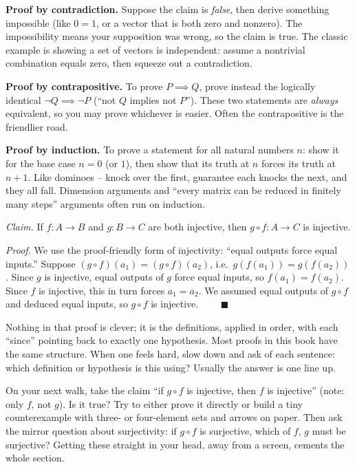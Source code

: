 \textbf{Proof by contradiction.} Suppose the claim is \emph{false}, then derive something
impossible (like $0 = 1$, or a vector that is both zero and nonzero). The impossibility
means your supposition was wrong, so the claim is true. The classic example is showing a
set of vectors is independent: assume a nontrivial combination equals zero, then squeeze
out a contradiction.

\textbf{Proof by contrapositive.} To prove $P \implies Q$, prove instead the logically
identical $\neg Q \implies \neg P$ (``not $Q$ implies not $P$''). These two statements
are \emph{always} equivalent, so you may prove whichever is easier. Often the
contrapositive is the friendlier road.

\textbf{Proof by induction.} To prove a statement for all natural numbers $n$: show it for
the base case $n = 0$ (or $1$), then show that its truth at $n$ forces its truth at $n+1$.
Like dominoes -- knock over the first, guarantee each knocks the next, and they all fall.
Dimension arguments and ``every matrix can be reduced in finitely many steps'' arguments
often run on induction.

\begin{example}\label{ch38:directproof}
\emph{Claim.} If $f:A\to B$ and $g:B\to C$ are both injective, then $g\circ f : A \to C$
is injective.

\emph{Proof.} We use the proof-friendly form of injectivity: ``equal outputs force equal
inputs.'' Suppose $(g\circ f)(a_1) = (g\circ f)(a_2)$, i.e.\ $g(f(a_1)) = g(f(a_2))$. Since
$g$ is injective, equal outputs of $g$ force equal inputs, so $f(a_1) = f(a_2)$. Since $f$
is injective, this in turn forces $a_1 = a_2$. We assumed equal outputs of $g\circ f$ and
deduced equal inputs, so $g \circ f$ is injective. $\qquad\blacksquare$
\end{example}

Nothing in that proof is clever; it is the definitions, applied in
order, with each ``since'' pointing back to exactly one hypothesis. Most
proofs in this book have the same structure. When one feels hard, slow down and
ask of each sentence: which definition or hypothesis is this using? Usually the
answer is one line up.

\begin{walkbox}
On your next walk, take the claim ``if $g \circ f$ is injective, then $f$ is injective''
(note: only $f$, not $g$). Is it true? Try to either prove it directly or build a tiny
counterexample with three- or four-element sets and arrows on paper. Then ask the mirror
question about surjectivity: if $g \circ f$ is surjective, which of $f$, $g$ must be
surjective? Getting these straight in your head, away from a screen, cements the whole
section.
\end{walkbox}

